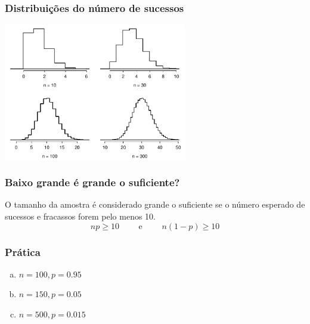 \begin{frame}
\frametitle{Distribuições do número de sucessos}
\justifying
{}

\begin{center}
\includegraphics[width=0.60\textwidth]{3-4_binomial_distribution/fourBinomialModelsShowingApproxToNormal.pdf}
\end{center}

\end{frame}


\begin{frame}
\frametitle{Baixo grande é grande o suficiente?}
\justifying
O tamanho da amostra é considerado grande o suficiente se o número esperado de sucessos e fracassos forem pelo menos 10.
\[ np \ge 10 \qquad \text{ e } \qquad n(1-p) \ge 10 \]


\end{frame}


\begin{frame}
\frametitle{Prática}
\justifying
{}

\begin{enumerate}[(a)]
\item $n = 100, p = 0.95$
 
\item $n = 150, p = 0.05$
\item $n = 500, p = 0.015$
\end{enumerate}

\end{frame}


